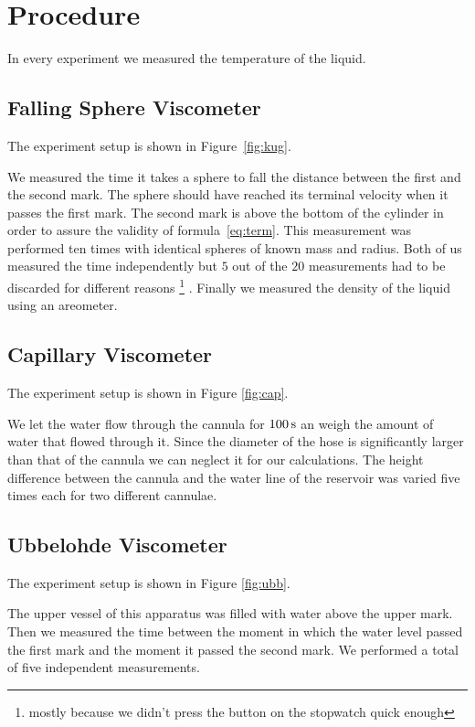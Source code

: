 \section{Procedure}
In every experiment we measured the temperature of the liquid.

\subsection{Falling Sphere Viscometer}

The experiment setup is shown in Figure~\ref{fig:kug}.

We measured the time it takes a sphere to fall the distance between the first and the second mark. The sphere should have reached its terminal velocity when it passes the first mark. The second mark is above the bottom of the cylinder in order to assure the validity of formula~\ref{eq:term}. This measurement was performed ten times with identical spheres of known mass and radius. Both of us measured the time independently but $5$ out of the $20$ measurements had to be discarded for different reasons%
\footnote{mostly because we didn't press the button on the stopwatch quick enough}%
.
Finally we measured the density of the liquid using an areometer.

\subsection{Capillary Viscometer}

The experiment setup is shown in Figure \ref{fig:cap}.

We let the water flow through the cannula for $\unit[100]{s}$ an weigh the amount of water that flowed through it. Since the diameter of the hose is significantly larger than that of the cannula we can neglect it for our calculations. The height difference between the cannula and the water line of the reservoir was varied five times each for two different cannulae. 

\subsection{Ubbelohde Viscometer}

The experiment setup is shown in Figure \ref{fig:ubb}.

The upper vessel of this apparatus was filled with water above the upper mark. Then we measured the time between the moment in which the water level passed the first mark and the moment it passed the second mark. We performed a total of five independent measurements.



